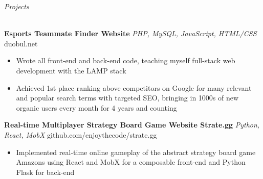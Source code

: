 \documentclass[letterpaper]{article}
\newcommand{\lineunder} {
    \vspace*{-8pt} \\
    \hspace*{-3pt} \hrulefill \\
}
\newcommand{\header} [1] {
	{\hspace*{-3pt}\vspace*{6pt} \textit{#1}}
    \vspace*{-6pt} \lineunder
}
\begin{document}
\header{Projects}
\vspace{1mm}


{\textbf{Esports Teammate Finder Website}} {\sl PHP, MySQL, JavaScript, HTML/CSS} \hfill duobul.net\\
\vspace{-2mm}
\begin{itemize} \itemsep -1pt
\item Wrote all front-end and back-end code, teaching myself full-stack web development with the LAMP stack \\
\item Achieved 1st place ranking above competitors on Google for many relevant and popular search terms with targeted SEO, bringing in 1000s of new organic users every month for 4 years and counting\\

\end{itemize}


{\textbf{Real-time Multiplayer Strategy Board Game Website Strate.gg}} {\sl Python, React, MobX} \hfill github.com/enjoythecode/strate.gg\\
\vspace{-2mm}
\begin{itemize} \itemsep -1pt
\item Implemented real-time online gameplay of the abstract strategy board game Amazons using React and MobX for a composable front-end and Python Flask for back-end\\
\end{itemize}
\end{document}

